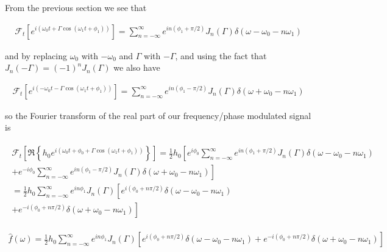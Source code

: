 \documentclass[onecolumn, groupedaddress, 10pt]{revtex4-1}
\begin{document}
From the previous section we see that

\begin{align}
\mathcal{F}_t \left[ e^{i(\omega_0 t + \Gamma \cos(\omega_1 t + \phi_1))} \right] 
= \sum_{n=-\infty}^{\infty} e^{in(\phi_1 + \pi/2)} J_n(\Gamma)  \delta(\omega - \omega_0 - n\omega_1)
\end{align}

and by replacing $\omega_0$ with $-\omega_0$ and $\Gamma$ with $-\Gamma$, and using the fact that $J_n(-\Gamma) = (-1)^n J_n (\Gamma)$ we also have

\begin{align}
\mathcal{F}_t \left[ e^{i(-\omega_0 t - \Gamma \cos(\omega_1 t + \phi_1))} \right] 
= \sum_{n=-\infty}^{\infty} e^{in(\phi_1 - \pi/2)} J_n(\Gamma)  \delta(\omega + \omega_0 - n\omega_1)
\end{align}

so the Fourier transform of the real part of our frequency/phase modulated signal is

\begin{align}
\begin{split}
\mathcal{F}_t \left[ \Re \left\{ h_0 e^{i\left( \omega_0 t + \phi_0 + \Gamma \cos( \omega_1 t + \phi_1 ) \right)} \right\} \right]
= \frac{1}{2} h_0 \left[ e^{ i\phi_0} \sum_{n=-\infty}^{\infty} e^{in(\phi_1 + \pi/2)} J_n(\Gamma)  \delta(\omega - \omega_0 - n\omega_1) \right.	\\
+ \left. e^{-i\phi_0} \sum_{n=-\infty}^{\infty} e^{in(\phi_1 - \pi/2)} J_n(\Gamma)  \delta(\omega + \omega_0 - n\omega_1) \right]					\\
= \frac{1}{2} h_0 \sum_{n=-\infty}^{\infty} e^{in\phi_1} J_n (\Gamma) \left[ e^{i(\phi_0 + n\pi/2)} \delta(\omega - \omega_0 - n\omega_1) \right.	\\
+ \left. e^{-i(\phi_0 + n\pi/2)} \delta(\omega + \omega_0 - n\omega_1) \right]
\end{split}
\end{align}



\begin{align}
\label{eqn:realFourierTransform}
\hat{f}(\omega) = 
\frac{1}{2} h_0 \sum_{n=-\infty}^{\infty} e^{in\phi_1} J_n (\Gamma) \left[ e^{i(\phi_0 + n\pi/2)} \delta(\omega - \omega_0 - n\omega_1)
+ e^{-i(\phi_0 + n\pi/2)} \delta(\omega + \omega_0 - n\omega_1) \right]
\end{align}
\end{document}

